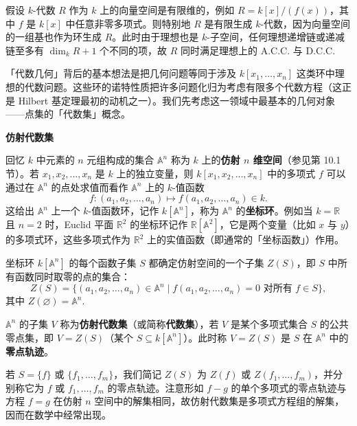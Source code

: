 \begin{example}
假设 \(k\)-代数 \(R\) 作为 \(k\) 上的向量空间是有限维的，例如 \(R = k[x]/(f(x))\)，其中 \(f\) 是 \(k[x]\) 中任意非零多项式。则特别地 \(R\) 是有限生成 \(k\)-代数，因为向量空间的一组基也作为环生成 \(R\)。此时由于理想也是 \(k\)-子空间，任何理想递增链或递减链至多有 \(\dim_kR+1\) 个不同的项，故 \(R\) 同时满足理想上的 A.C.C. 与 D.C.C.
\end{example}

「代数几何」背后的基本想法是把几何问题等同于涉及 \(k[x_1, \ldots, x_n]\) 这类环中理想的代数问题。这些环的诺特性质把许多问题化归为考虑有限多个代数方程（这正是 Hilbert 基定理最初的动机之一）。我们先考虑这一领域中最基本的几何对象——点集的「代数集」概念。

\noindent\textbf{仿射代数集}

回忆 \(k\) 中元素的 \(n\) 元组构成的集合 \(\mathbb{A}^n\) 称为 \(k\) 上的\textbf{仿射 \(n\) 维空间}（参见第 10.1 节）。若 \(x_1, x_2, \ldots, x_n\) 是 \(k\) 上的独立变量，则 \(k[x_1, x_2, \ldots, x_n]\) 中的多项式 \(f\) 可以通过在 \(\mathbb{A}^n\) 的点处求值而看作 \(\mathbb{A}^n\) 上的 \(k\)-值函数
\[
f : (a_1, a_2, \ldots, a_n) \mapsto f(a_1, a_2, \ldots, a_n) \in k.
\]
这给出 \(\mathbb{A}^n\) 上一个 \(k\)-值函数环，记作 \(k[\mathbb{A}^n]\)，称为 \(\mathbb{A}^n\) 的\textbf{坐标环}。例如当 \(k = \mathbb{R}\) 且 \(n = 2\) 时，Euclid 平面 \(\mathbb{R}^2\) 的坐标环记作 \(\mathbb{R}[\mathbb{A}^2]\)，它是两个变量（比如 \(x\) 与 \(y\)）的多项式环，这些多项式作为 \(\mathbb{R}^2\) 上的实值函数（即通常的「坐标函数」）作用。

坐标环 \(k[\mathbb{A}^n]\) 的每个函数子集 \(S\) 都确定仿射空间的一个子集 \(Z(S)\)，即 \(S\) 中所有函数同时取零的点的集合：
\[
Z(S) = \{(a_1, a_2, \ldots, a_n) \in \mathbb{A}^n \mid f(a_1, a_2, \ldots, a_n) = 0 \text{ 对所有 } f \in S\},
\]
其中 \(Z(\varnothing) = \mathbb{A}^n\).

\begin{definition}
\(\mathbb{A}^n\) 的子集 \(V\) 称为\textbf{仿射代数集}（或简称\textbf{代数集}），若 \(V\) 是某个多项式集合 \(S\) 的公共零点集，即 \(V = Z(S)\)（某个 \(S \subseteq k[\mathbb{A}^n]\)）。此时称 \(V = Z(S)\) 是 \(S\) 在 \(\mathbb{A}^n\) 中的\textbf{零点轨迹}。
\end{definition}

若 \(S = \{f\}\) 或 \(\{f_1, \ldots, f_m\}\)，我们简记 \(Z(S)\) 为 \(Z(f)\) 或 \(Z(f_1, \ldots, f_m)\)，并分别称它为 \(f\) 或 \(f_1, \ldots, f_m\) 的零点轨迹。注意形如 \(f-g\) 的单个多项式的零点轨迹与方程 \(f = g\) 在仿射 \(n\) 空间中的解集相同，故仿射代数集是多项式方程组的解集，因而在数学中经常出现。

